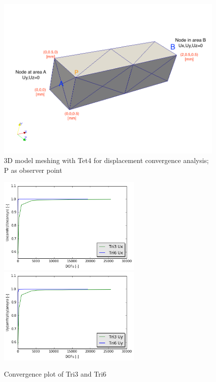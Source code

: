 \begin{figure}[htbp]
	\begin{center}	
		\includegraphics[width=14cm,clip]{Convergence3D.png} 			
		\caption{3D model meshing with Tet4 for displacement convergence analysis; P as observer point} \label{fig: Convergence3D}
	\end{center}
\end{figure}

\begin{figure}[htbp]
	\begin{center}	
		\includegraphics[width=7cm,clip]{TriConPlotUx.png}
		\includegraphics[width=7cm,clip]{TriConPlotUy.png} 	 			
		\caption{Convergence plot of Tri3 and Tri6} \label{fig: TriConPlot}
	\end{center}
\end{figure}

